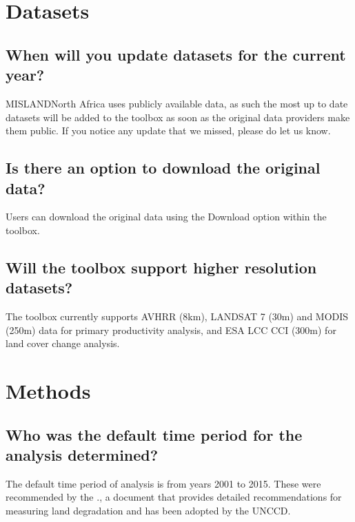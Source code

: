 \documentclass[letterpaper,10pt,english]{sphinxmanual}
\begin{document}
\section{Datasets}
\label{\detokenize{Introduction/faq:datasets}}

\subsection{When will you update datasets for the current year?}
\label{\detokenize{Introduction/faq:when-will-you-update-datasets-for-the-current-year}}
\sphinxAtStartPar
MISLAND\sphinxhyphen{}North Africa uses publicly available data, as such the most up to date datasets
will be added to the toolbox as soon as the original data providers make them
public. If you notice any update that we missed, please do let us know.


\subsection{Is there an option to download the original data?}
\label{\detokenize{Introduction/faq:is-there-an-option-to-download-the-original-data}}
\sphinxAtStartPar
Users can download the original data using the Download option within the
toolbox.


\subsection{Will the toolbox support higher resolution datasets?}
\label{\detokenize{Introduction/faq:will-the-toolbox-support-higher-resolution-datasets}}
\sphinxAtStartPar
The toolbox currently supports AVHRR (8km), LANDSAT 7 (30m) and MODIS (250m) data for primary
productivity analysis, and ESA LCC CCI (300m) for land cover change analysis.


\section{Methods}
\label{\detokenize{Introduction/faq:methods}}

\subsection{Who was the default time period for the analysis determined?}
\label{\detokenize{Introduction/faq:who-was-the-default-time-period-for-the-analysis-determined}}
\sphinxAtStartPar
The default time period of analysis is from years 2001 to 2015. These were
recommended by the .,
a document that provides detailed recommendations for measuring land
degradation and has been adopted by the UNCCD.
\end{document}
